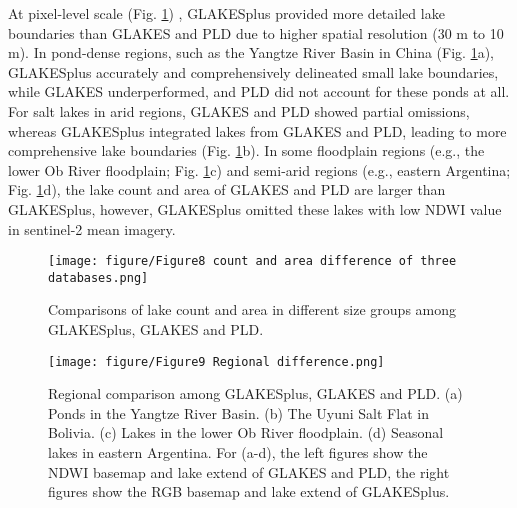 \documentclass[preprint,12pt,authoryear]{elsarticle}
\begin{document}
At pixel-level scale (Fig. \ref{fig:Fig8}) , GLAKESplus provided more detailed lake boundaries than GLAKES and PLD due to higher spatial resolution (30 m to 10 m). In pond-dense regions, such as the Yangtze River Basin in China (Fig. \ref{fig:Fig8}a), GLAKESplus accurately and comprehensively delineated small lake boundaries, while GLAKES underperformed, and PLD did not account for these ponds at all. For salt lakes in arid regions, GLAKES and PLD showed partial omissions, whereas GLAKESplus integrated lakes from GLAKES and PLD, leading to more comprehensive lake boundaries (Fig. \ref{fig:Fig8}b). In some floodplain regions (e.g., the lower Ob River floodplain; Fig. \ref{fig:Fig8}c) and semi-arid regions (e.g., eastern Argentina; Fig. \ref{fig:Fig8}d), the lake count and area of GLAKES and PLD are larger than GLAKESplus, however, GLAKESplus omitted these lakes with low NDWI value in sentinel-2 mean imagery.

\begin{figure}[h]
    \centering
    \texttt{[image: figure/Figure8 count and area difference of three databases.png]}
    \caption{Comparisons of lake count and area in different size groups among GLAKESplus, GLAKES and PLD.}
    \label{fig:Fig8}
\end{figure}

\begin{figure}[h]
    \centering
    \texttt{[image: figure/Figure9 Regional difference.png]}
    \caption{Regional comparison among GLAKESplus, GLAKES and PLD. (a) Ponds in the Yangtze River Basin. (b) The Uyuni Salt Flat in Bolivia. (c) Lakes in the lower Ob River floodplain. (d) Seasonal lakes in eastern Argentina. For (a-d), the left figures show the NDWI basemap and lake extend of GLAKES and PLD, the right figures show the RGB basemap and lake extend of GLAKESplus.}
    \label{fig:Fig9}
\end{figure}
\end{document}
